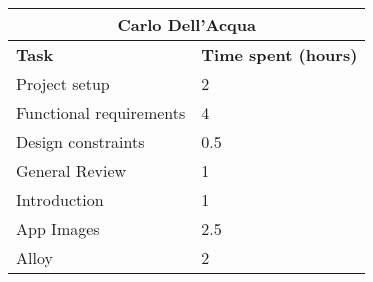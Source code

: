 \begin{table}[h]
  \centering
  \begin{tabular}{l|l}
    \multicolumn{2}{c}{\textbf{Carlo Dell'Acqua}} \\
    \hline
    \textbf{Task} & \textbf{Time spent (hours)}\\
    \hline
    Project setup & 2 \\
    Functional requirements & 4 \\
    Design constraints & 0.5 \\
    General Review & 1 \\
    Introduction & 1 \\
    App Images & 2.5 \\
    Alloy & 2 \\
  \end{tabular}
\end{table}